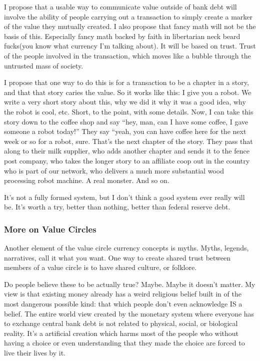 I propose that a usable way to communicate value outside of bank debt
will involve the ability of people carrying out a transaction to simply
create a marker of the value they mutually created. I also propose that
fancy math will not be the basis of this. Especially fancy math backed
by faith in libertarian neck beard fucks(you know what currency I'm
talking about). It will be based on trust. Trust of the people involved
in the transaction, which moves like a bubble through the untrusted mass
of society.

I propose that one way to do this is for a transaction to be a chapter
in a story, and that that story caries the value. So it works like this:
I give you a robot. We write a very short story about this, why we did
it why it was a good idea, why the robot is cool, etc. Short, to the
point, with some details. Now, I can take this story down to the coffee
shop and say ``hey, man, can I have some coffee, I gave someone a robot
today!'' They say ``yeah, you can have coffee here for the next week or
so for a robot, sure. That's the next chapter of the story. They pass
that along to their milk supplier, who adds another chapter and sends it
to the fence post company, who takes the longer story to an affiliate
coop out in the country who is part of our network, who delivers a much
more substantial wood processing robot machine. A real monster. And so
on.

It's not a fully formed system, but I don't think a good system ever
really will be. It's worth a try, better than nothing, better than
federal reserve debt.

\subsubsection{More on Value Circles}\label{more-on-value-circles}

Another element of the value circle currency concepts is myths. Myths,
legends, narratives, call it what you want. One way to create shared
trust between members of a value circle is to have shared culture, or
folklore.

Do people believe these to be actually true? Maybe. Maybe it doesn't
matter. My view is that existing money already has a weird religious
belief built in of the most dangerous possible kind: that which people
don't even acknowledge IS a belief. The entire world view created by the
monetary system where everyone has to exchange central bank debt is not
related to physical, social, or biological reality. It's a artificial
creation which harms most of the people who without having a choice or
even understanding that they made the choice are forced to live their
lives by it.

